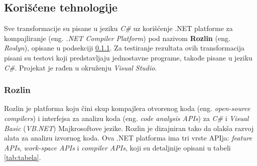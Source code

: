 \documentclass[a4paper]{article}
\begin{document}
{		
		
		
		\subsection{Korišćene tehnologije}
		\label{subsec:koriscene_tehnologije}
		
		Sve transformacije su pisane u jeziku \textit{C\#} uz korišćenje .NET platforme za kompajliranje (eng. \textit{.NET Compiler Platform}) pod nazivom \textbf{Rozlin}
		(eng. \textit{Roslyn}), opisane u podsekciji \ref{subsubsec:rozlin}. Za testiranje rezultata ovih transformacija pisani su testovi koji predstavljaju jednostavne programe, takođe pisane u jeziku \textit{C\#}. Projekat je rađen u okruženju \textit{Visual Studio}.
		
		\subsubsection{Rozlin}
		\label{subsubsec:rozlin}
		
		Rozlin je platforma koju čini skup kompajlera otvorenog koda (eng. \textit{open-source compilers}) i interfejsa za analizu koda (eng. \textit{code analysis APIs}) za \textit{C\#} i \textit{Visual Basic} (\textit{VB.NET}) Majkrosoftove jezike. Rozlin je dizajniran tako da olakša razvoj alata za analizu izvornog koda. Ova .NET platforma ima tri vrste APIja: \textit{feature APIs}, \textit{work-space APIs} i \textit{compiler APIs}, koji su detaljnije opisani u tabeli \ref{tab:tabela}.
		
}
\end{document}
